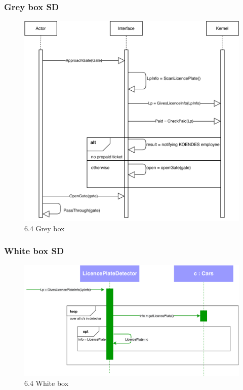 \subsubsection{Grey box SD}
\creator{\studentB}
\begin{figure}[H]
    \centering
    \includegraphics[width=\textwidth]{Iteration_3/Files/UC4_gb2.pdf}
    \caption{6.4 Grey box}
    \label{fig:6.2 Greybox}
\end{figure}

\newpage
\subsubsection{White box SD}
\creator{\studentA}

\begin{figure}[H]
    \centering
    \includegraphics[width=\textwidth]{Iteration_3/Files/UC4_wb1.pdf}
    \caption{6.4 White box}
    \label{fig:6.2 Greybox}
\end{figure}

